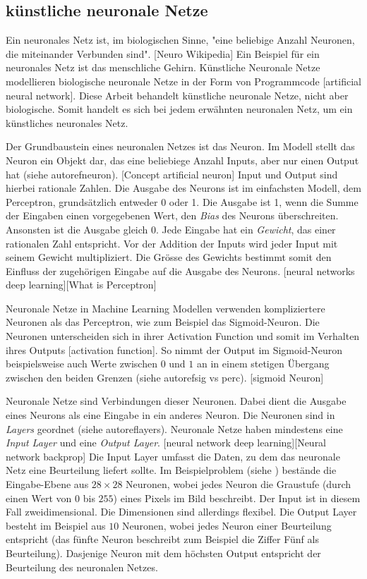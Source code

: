 \subsection{künstliche neuronale Netze}
\label{sub:t_ml_nn}
Ein neuronales Netz ist, im biologischen Sinne, "eine beliebige Anzahl Neuronen,
die miteinander Verbunden sind". [Neuro Wikipedia] Ein Beispiel für ein
neuronales Netz ist das menschliche Gehirn. Künstliche Neuronale Netze
modellieren biologische neuronale Netze in der Form von Programmcode [artificial
neural network]. Diese Arbeit behandelt künstliche neuronale Netze, nicht aber
biologische. Somit handelt es sich bei jedem erwähnten neuronalen Netz, um ein
künstliches neuronales Netz.

Der Grundbaustein eines neuronalen Netzes ist das Neuron. Im Modell stellt das
Neuron ein Objekt dar, das eine beliebiege Anzahl Inputs, aber nur einen Output
hat (siehe autoref{neuron}). [Concept artificial neuron] Input und Output sind
hierbei rationale Zahlen. Die Ausgabe des Neurons ist im einfachsten Modell, dem
Perceptron, grundsätzlich entweder 0 oder 1. Die Ausgabe ist 1, wenn die Summe
der Eingaben einen vorgegebenen Wert, den \emph{Bias} des Neurons überschreiten.
Ansonsten ist die Ausgabe gleich 0. Jede Eingabe hat ein \emph{Gewicht}, das
einer rationalen Zahl entspricht. Vor der Addition der Inputs wird jeder Input
mit seinem Gewicht multipliziert.  Die Grösse des Gewichts bestimmt somit den
Einfluss der zugehörigen Eingabe auf die Ausgabe des Neurons. [neural networks
deep learning][What is Perceptron]


Neuronale Netze in Machine Learning Modellen verwenden kompliziertere Neuronen
als das Perceptron, wie zum Beispiel das Sigmoid-Neuron. Die Neuronen
unterscheiden sich in ihrer Activation Function und somit im Verhalten ihres
Outputs [activation function]. So nimmt der Output im Sigmoid-Neuron
beispielsweise auch Werte zwischen $0$ und $1$ an in einem stetigen Übergang
zwischen den beiden Grenzen (siehe autoref{sig vs perc}). [sigmoid Neuron]


Neuronale Netze sind Verbindungen dieser Neuronen. Dabei dient die Ausgabe eines
Neurons als eine Eingabe in ein anderes Neuron. Die Neuronen sind in
\emph{Layers} geordnet (siehe autoref{layers}). Neuronale Netze haben mindestens
eine \emph{Input Layer} und eine \emph{Output Layer}. [neural network deep
learning][Neural network backprop] Die Input Layer umfasst die Daten, zu dem das
neuronale Netz eine Beurteilung liefert sollte. Im Beispielproblem (siehe
) bestände die Eingabe-Ebene aus $28\times28$ Neuronen, wobei
jedes Neuron die Graustufe (durch einen Wert von $0$ bis $255$) eines Pixels im
Bild beschreibt. Der Input ist in diesem Fall zweidimensional. Die Dimensionen
sind allerdings flexibel. Die Output Layer besteht im Beispiel aus $10$
Neuronen, wobei jedes Neuron einer Beurteilung entspricht (das fünfte Neuron
beschreibt zum Beispiel die Ziffer Fünf als Beurteilung). Dasjenige Neuron mit
dem höchsten Output entspricht der Beurteilung des neuronalen Netzes.

